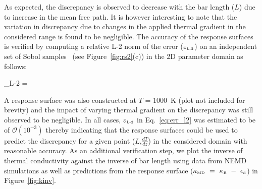 As expected, the discrepancy is observed to decrease
 with the bar length ($L$) due to increase in the mean free path. It is however interesting to note that the 
 variation in discrepancy due to changes in the applied thermal gradient in the considered range is found to be
 negligible. The accuracy of the response surfaces is verified by computing a relative L-2 norm of the error
 ($\varepsilon_{\tiny{\mbox{L-2}}}$) on an independent set of Sobol samples~\cite{Saltelli:2010}
(see Figure~\ref{fig:rs2}(c)) in the 2D 
 parameter domain as follows:
 
 \be
 \varepsilon_{\tiny{\mbox{L-2}}} =  
 \label{eq:err_l2}
 \ee
 
 A response surface was also constructed at $T$ = 1000~K (plot not included for brevity) and the impact of
 varying thermal gradient on the discrepancy was still observed to be negligible. In all cases,
 $\varepsilon_{\tiny{\mbox{L-2}}}$ in Eq.~\ref{eq:err_l2} was estimated to be of $\mathcal{O}(10^{-3})$ thereby
 indicating that the response surfaces could be used to predict the discrepancy for a given
 point ($L$,$\frac{dT}{dz}$) in the considered domain with reasonable accuracy. As an additional verification
 step, we plot the inverse of thermal conductivity against the inverse of bar length using data from NEMD
 simulations as well as predictions from the response surface 
($\kappa_{\mbox{\tiny{MD}}}~=~\kappa_{\mbox{\tiny{E}}}~-~\epsilon_{\mbox{\tiny{d}}}$) in Figure~\ref{fig:kinv}.

